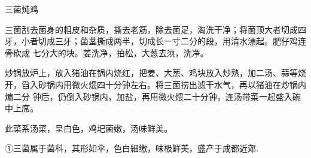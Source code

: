 \begin{recipe}{三菌炖鸡}

\ingredients


\cooking

\step 三菌刮去菌身的粗皮和杂质，撕去老筋，除去菌足，淘洗干净；将菌顶大者切成四
牙，小者切成三牙；菌茎撕成两半，切成长一寸二分的段，用清水漂起。肥仔鸡连骨砍成
七分大的块。姜洗净，拍松，大葱去须，洗净。

\step 炒锅放炉上，放入猪油在锅内烧红，把姜、大葱、鸡块放入炒熟，加二汤、蒜等烧
开，舀入砂锅内用微火煨四十分钟左右。将三菌捞出滤干水气，再以猪油在炒锅内煸二分
钟后，仍倒入砂锅内，加盐，再用微火煨二十分钟，连汤带菜一起盛入碗中上席。

\notes

此菜系汤菜，呈白色，鸡圯菌嫩，汤味鲜美。

①三菌属于菌科，其形如伞，色白細缴，味极鲜美，盛产于成都近郊.

\end{recipe}

